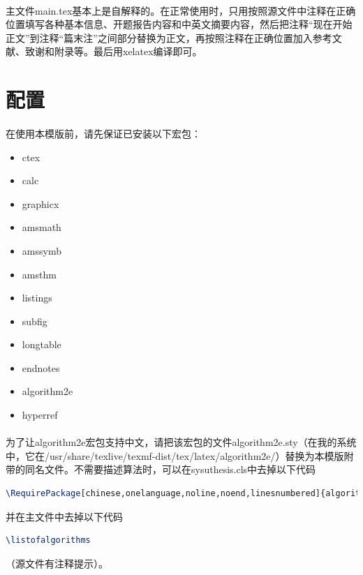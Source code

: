 ﻿\documentclass{sysuthesis}
\begin{document}
\paragraph{}主文件{\ttfamily main.tex}基本上是自解释的。在正常使用时，只用按照源文件中注释在正确位置填写各种基本信息、开题报告内容和中英文摘要内容，然后把注释``现在开始正文''到注释``篇末注''之间部分替换为正文，再按照注释在正确位置加入参考文献、致谢和附录等。最后用{\ttfamily xelatex}编译即可。

\section{配置}

\paragraph{}在使用本模版前，请先保证已安装以下宏包：

\begin{itemize}
\item {\ttfamily ctex}
\item {\ttfamily calc}
\item {\ttfamily graphicx}
\item {\ttfamily amsmath}
\item {\ttfamily amssymb}
\item {\ttfamily amsthm}
\item {\ttfamily listings}
\item {\ttfamily subfig}
\item {\ttfamily longtable}
\item {\ttfamily endnotes}
\item {\ttfamily algorithm2e}
\item {\ttfamily hyperref}
\end{itemize}

\paragraph{}为了让{\ttfamily algorithm2e}宏包支持中文，请把该宏包的文件{\ttfamily algorithm2e.sty}（在我的系统中，它在{\ttfamily /usr/share/texlive/texmf-dist/tex/latex/algorithm2e/}）替换为本模版附带的同名文件。不需要描述算法时，可以在{\ttfamily sysuthesis.cls}中去掉以下代码
\begin{lstlisting}[language=TeX, keywordstyle=\color{blue}\bfseries, basicstyle=\ttfamily, breaklines=true, frame=shadowbox]
\RequirePackage[chinese,onelanguage,noline,noend,linesnumbered]{algorithm2e}
\end{lstlisting}
并在主文件中去掉以下代码
\begin{lstlisting}[language=TeX, keywordstyle=\color{blue}\bfseries, basicstyle=\ttfamily, breaklines=true, frame=shadowbox]
\listofalgorithms
\end{lstlisting}
（源文件有注释提示）。
\end{document}
